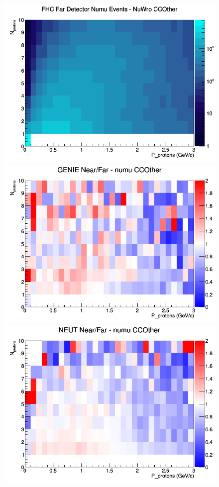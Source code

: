 \begin{figure}[h]
\endminipage
{}
\includegraphics[width=\linewidth]{N_P/nominal/protons/CCOther_FHC_FD_numu_N_P_NuWro.png}
\endminipage
\newline
{}
\includegraphics[width=\linewidth]{N_P/nominal/protons/ratios/CCOther_GENIE_numu_NF_N_P.png}
\endminipage
{}
\includegraphics[width=\linewidth]{N_P/nominal/protons/ratios/CCOther_NEUT_numu_NF_N_P.png}

\end{figure}
